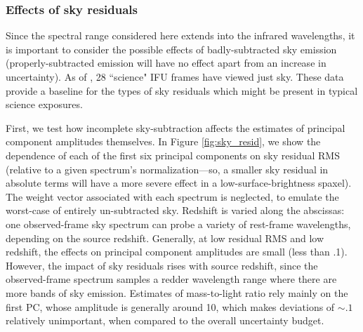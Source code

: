 \subsubsection{Effects of sky residuals}
\label{chap1:subsubsec:sky_resid}

Since the spectral range considered here extends into the infrared wavelengths, it is important to consider the possible effects of badly-subtracted sky emission (properly-subtracted emission will have no effect apart from an increase in uncertainty). As of \mplv, 28 ``science" IFU frames have viewed just sky. These data provide a baseline for the types of sky residuals which might be present in typical science exposures.

First, we test how incomplete sky-subtraction affects the estimates of principal component amplitudes themselves. In Figure \ref{fig:sky_resid}, we show the dependence of each of the first six principal components on sky residual RMS (relative to a given spectrum's normalization---so, a smaller sky residual in absolute terms will have a more severe effect in a low-surface-brightness spaxel). The weight vector associated with each spectrum is neglected, to emulate the worst-case of entirely un-subtracted sky. Redshift is varied along the abscissas: one observed-frame sky spectrum can probe a variety of rest-frame wavelengths, depending on the source redshift. Generally, at low residual RMS and low redshift, the effects on principal component amplitudes are small (less than .1). However, the impact of sky residuals rises with source redshift, since the observed-frame spectrum samples a redder wavelength range where there are more bands of sky emission. Estimates of mass-to-light ratio rely mainly on the first PC, whose amplitude is generally around 10, which makes deviations of $\sim .1$ relatively unimportant, when compared to the overall uncertainty budget.

